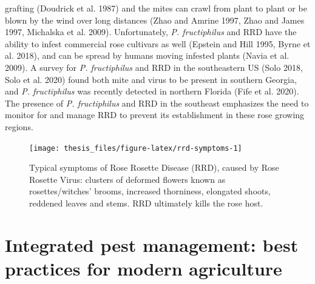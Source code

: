 \documentclass[12pt,final,CPage]{ufthesis}
\begin{document}
{grafting (Doudrick et al. 1987) and the mites can crawl from plant to plant or be blown by the wind over long distances (Zhao and Amrine 1997, Zhao and James 1997, Michalska et al. 2009). Unfortunately, \emph{P. fructiphilus} and RRD have the ability to infest commercial rose cultivars as well (Epstein and Hill 1995, Byrne et al. 2018), and can be spread by humans moving infested plants (Navia et al. 2009). A survey for \emph{P. fructiphilus} and RRD in the southeastern US (Solo 2018, Solo et al. 2020) found both mite and virus to be present in southern Georgia, and \emph{P. fructiphilus} was recently detected in northern Florida (Fife et al. 2020). The presence of \emph{P. fructiphilus} and RRD in the southeast emphasizes the need to monitor for and manage RRD to prevent its establishment in these rose growing regions.
  \begin{figure}

  {\centering \texttt{[image: thesis\_files/figure-latex/rrd-symptoms-1]} 

  }

  \caption{Typical symptoms of Rose Rosette Disease (RRD), caused by Rose Rosette Virus: clusters of deformed flowers known as rosettes/witches' brooms, increased thorniness, elongated shoots, reddened leaves and stems. RRD ultimately kills the rose host.}\label{fig:rrd-symptoms}
  \end{figure}
  \hypertarget{litrev-ipm}{%
  \section{Integrated pest management: best practices for modern agriculture}\label{litrev-ipm}}

}
\end{document}
